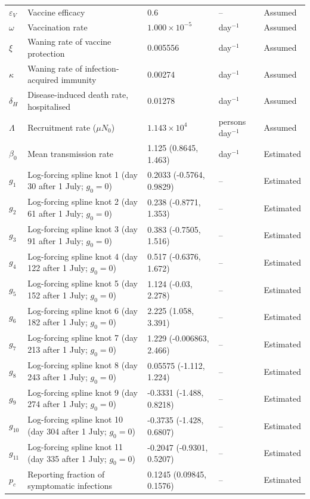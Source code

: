 \begin{longtable}{llll l}
$\varepsilon_V$ & Vaccine efficacy & 0.6 & -- & Assumed\\
$\omega$ & Vaccination rate & $1.000\times10^{-5}$ & day$^{-1}$ & Assumed\\
$\xi$ & Waning rate of vaccine protection & 0.005556 & day$^{-1}$ & Assumed\\
$\kappa$ & Waning rate of infection-acquired immunity & 0.00274 & day$^{-1}$ & Assumed\\
$\delta_H$ & Disease-induced death rate, hospitalised & 0.01278 & day$^{-1}$ & Assumed\\
$\Lambda$ & Recruitment rate ($\mu N_0$) & $1.143\times10^{4}$ & persons day$^{-1}$ & Assumed\\
$\beta_0$ & Mean transmission rate & 1.125 (0.8645, 1.463) & day$^{-1}$ & Estimated\\
$g_{1}$ & Log-forcing spline knot 1 (day 30 after 1 July; $g_0=0$) & 0.2033 (-0.5764, 0.9829) & -- & Estimated\\
$g_{2}$ & Log-forcing spline knot 2 (day 61 after 1 July; $g_0=0$) & 0.238 (-0.8771, 1.353) & -- & Estimated\\
$g_{3}$ & Log-forcing spline knot 3 (day 91 after 1 July; $g_0=0$) & 0.383 (-0.7505, 1.516) & -- & Estimated\\
$g_{4}$ & Log-forcing spline knot 4 (day 122 after 1 July; $g_0=0$) & 0.517 (-0.6376, 1.672) & -- & Estimated\\
$g_{5}$ & Log-forcing spline knot 5 (day 152 after 1 July; $g_0=0$) & 1.124 (-0.03, 2.278) & -- & Estimated\\
$g_{6}$ & Log-forcing spline knot 6 (day 182 after 1 July; $g_0=0$) & 2.225 (1.058, 3.391) & -- & Estimated\\
$g_{7}$ & Log-forcing spline knot 7 (day 213 after 1 July; $g_0=0$) & 1.229 (-0.006863, 2.466) & -- & Estimated\\
$g_{8}$ & Log-forcing spline knot 8 (day 243 after 1 July; $g_0=0$) & 0.05575 (-1.112, 1.224) & -- & Estimated\\
$g_{9}$ & Log-forcing spline knot 9 (day 274 after 1 July; $g_0=0$) & -0.3331 (-1.488, 0.8218) & -- & Estimated\\
$g_{10}$ & Log-forcing spline knot 10 (day 304 after 1 July; $g_0=0$) & -0.3735 (-1.428, 0.6807) & -- & Estimated\\
$g_{11}$ & Log-forcing spline knot 11 (day 335 after 1 July; $g_0=0$) & -0.2047 (-0.9301, 0.5207) & -- & Estimated\\
$p_c$ & Reporting fraction of symptomatic infections & 0.1245 (0.09845, 0.1576) & -- & Estimated\\

\end{longtable}
